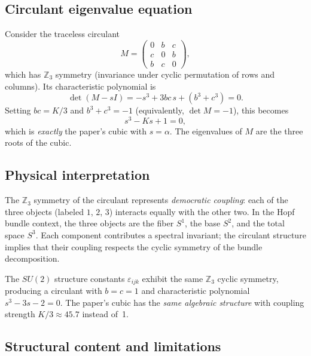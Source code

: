 \documentclass[aps,prl,twocolumn,superscriptaddress]{revtex4-2}
\begin{document}
\subsection{Circulant eigenvalue equation}

Consider the traceless circulant
\begin{equation}\label{eq:circulant}
  M = \begin{pmatrix} 0 & b & c \\ c & 0 & b \\ b & c & 0
      \end{pmatrix},
\end{equation}
which has $\mathbb{Z}_3$ symmetry (invariance under cyclic permutation
of rows and columns). Its characteristic polynomial is
\begin{equation}
  \det(M - sI) = -s^3 + 3bc\,s + (b^3 + c^3) = 0.
\end{equation}
Setting $bc = K/3$ and $b^3 + c^3 = -1$ (equivalently,
$\det M = -1$), this becomes
\begin{equation}
  s^3 - Ks + 1 = 0,
\end{equation}
which is \textit{exactly} the paper's cubic with $s = \alpha$. The
eigenvalues of $M$ are the three roots of the cubic.

\subsection{Physical interpretation}

The $\mathbb{Z}_3$ symmetry of the circulant represents
\textit{democratic coupling}: each of the three objects (labeled $1$,
$2$, $3$) interacts equally with the other two. In the Hopf bundle
context, the three objects are the fiber $S^1$, the base $S^2$, and
the total space $S^3$. Each component contributes a spectral
invariant; the circulant structure implies that their coupling respects
the cyclic symmetry of the bundle decomposition.

The $SU(2)$ structure constants $\varepsilon_{ijk}$ exhibit the same
$\mathbb{Z}_3$ cyclic symmetry, producing a circulant with $b = c = 1$
and characteristic polynomial $s^3 - 3s - 2 = 0$. The paper's cubic
has the \textit{same algebraic structure} with coupling strength
$K/3 \approx 45.7$ instead of~1.

\subsection{Structural content and limitations}
\end{document}
